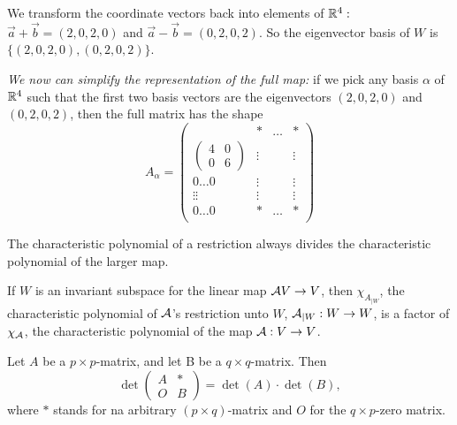 \begin{example}
    We transform the coordinate vectors back into elements of $\mathbb{R}^4:$ $\vec{a} + \vec{b} = (2,0,2,0)$ and $\vec{a} - \vec{b} = (0,2,0,2)$.
    So the eigenvector basis of $W$ is $\{(2,0,2,0), (0,2,0,2)\}$.

    \emph{We now can simplify the representation of the full map:} if we pick any basis $\alpha$ of $\mathbb{R}^4$ such that the first two basis vectors
    are the eigenvectors $(2,0,2,0)$ and $(0,2,0,2)$, then the full matrix has the shape
    $$A_\alpha = \begin{pmatrix}
                                                      & * & \dots & * \\
         \begin{pmatrix} 4 & 0 \\ 0 & 6\end{pmatrix}  & \vdots & & \vdots \\
        0  \dots  0 & \vdots & & \vdots \\
           \vdots\vdots & \vdots & & \vdots \\
        0  \dots  0 & * & \dots & * \\
    \end{pmatrix}$$
\end{example}

\begin{remark}
    The characteristic polynomial of a restriction always divides the characteristic polynomial of the larger map.
\end{remark}

\begin{theorem}
    If $W$ is an invariant subspace for the linear map $\mathcal{A} V \to V$, then $\chi_{A_{|W}}$, the characteristic polynomial of $\mathcal{A}$'s restriction unto
    $W$, $\mathcal{A}_{|W}: W \to W$, is a factor of $\chi_{\mathcal{A}}$, the characteristic polynomial of the map $\mathcal{A}: V \to V$.
\end{theorem}

\begin{lemma}
    Let $A$ be a $p \times p$-matrix, and let B be a $q \times q$-matrix. Then
    $$\det \begin{pmatrix}A & * \\ O  & B \end{pmatrix} = \det(A)\cdot\det(B),$$
    where $*$ stands for na arbitrary $(p \times q)$-matrix and $O$ for the $q \times p$-zero matrix.
\end{lemma}

